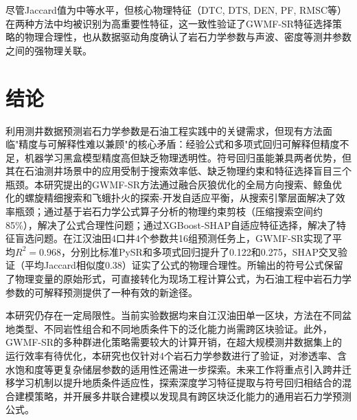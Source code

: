 \documentclass[a4paper,12pt]{ctexart}
\begin{document}
尽管Jaccard值为中等水平，但核心物理特征（DTC, DTS, DEN, PF, RMSC等）在两种方法中均被识别为高重要性特征，这一致性验证了GWMF-SR特征选择策略的物理合理性，也从数据驱动角度确认了岩石力学参数与声波、密度等测井参数之间的强物理关联。

\section{结论}

利用测井数据预测岩石力学参数是石油工程实践中的关键需求，但现有方法面临"精度与可解释性难以兼顾"的核心矛盾：经验公式和多项式回归可解释但精度不足，机器学习黑盒模型精度高但缺乏物理透明性。符号回归虽能兼具两者优势，但其在石油测井场景中的应用受制于搜索效率低、缺乏物理约束和特征选择盲目三个瓶颈。本研究提出的GWMF-SR方法通过融合灰狼优化的全局方向搜索、鲸鱼优化的螺旋精细搜索和飞蛾扑火的探索-开发自适应平衡，从搜索引擎层面解决了效率瓶颈；通过基于岩石力学公式算子分析的物理约束剪枝（压缩搜索空间约85\%），解决了公式合理性问题；通过XGBoost-SHAP自适应特征选择，解决了特征盲选问题。在江汉油田4口井4个参数共16组预测任务上，GWMF-SR实现了平均$R^2=0.968$，分别比标准PySR和多项式回归提升了0.122和0.275，SHAP交叉验证（平均Jaccard相似度0.38）证实了公式的物理合理性。所输出的符号公式保留了物理变量的原始形式，可直接转化为现场工程计算公式，为石油工程中岩石力学参数的可解释预测提供了一种有效的新途径。

本研究仍存在一定局限性。当前实验数据均来自江汉油田单一区块，方法在不同盆地类型、不同岩性组合和不同地质条件下的泛化能力尚需跨区块验证。此外，GWMF-SR的多种群进化策略需要较大的计算开销，在超大规模测井数据集上的运行效率有待优化，本研究也仅针对4个岩石力学参数进行了验证，对渗透率、含水饱和度等更复杂储层参数的适用性还需进一步探索。未来工作将重点引入跨井迁移学习机制以提升地质条件适应性，探索深度学习特征提取与符号回归相结合的混合建模策略，并开展多井联合建模以发现具有跨区块泛化能力的通用岩石力学预测公式。
\end{document}

